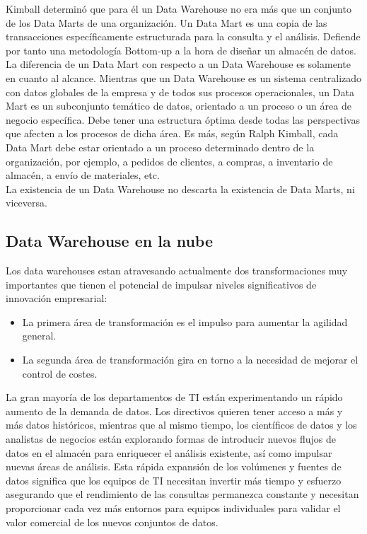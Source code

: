 \documentclass[%
 reprint,
 amsmath,amssymb,
 aps,
]{revtex4-1}
\begin{document}
\begin{itemize}
Kimball determinó que para él un Data Warehouse no era más que un conjunto de los Data Marts de una organización. Un Data Mart es una copia de las transacciones específicamente estructurada para la consulta y el análisis. Defiende por tanto una metodología Bottom-up a la hora de diseñar un almacén de datos.\\

La diferencia de un Data Mart con respecto a un Data Warehouse es solamente en cuanto al alcance. Mientras que un Data Warehouse es un sistema centralizado con datos globales de la empresa y de todos sus procesos operacionales, un Data Mart es un subconjunto temático de datos, orientado a un proceso o un área de negocio específica. Debe tener una estructura óptima desde todas las perspectivas que afecten a los procesos de dicha área. Es más, según Ralph Kimball, cada Data Mart debe estar orientado a un proceso determinado dentro de la organización, por ejemplo, a pedidos de clientes, a compras, a inventario de almacén, a envío de materiales, etc.\\

 La existencia de un Data Warehouse no descarta la existencia de Data Marts, ni viceversa. 

\end{itemize}





\subsection{Data Warehouse en la nube}

Los data warehouses estan atravesando actualmente dos transformaciones muy importantes que tienen el potencial de impulsar niveles significativos de innovación empresarial:


\begin{itemize}
	\item La primera área de transformación es el impulso para aumentar la agilidad general.
	\item La segunda área de transformación gira en torno a la necesidad de mejorar el control de costes.
\end{itemize}

La gran mayoría de los departamentos de TI están experimentando un rápido aumento de la demanda de datos. Los directivos quieren tener acceso a más y más datos históricos, mientras que al mismo tiempo, los científicos de datos y los analistas de negocios están explorando formas de introducir nuevos flujos de datos en el almacén para enriquecer el análisis existente, así como impulsar nuevas áreas de análisis. Esta rápida expansión de los volúmenes y fuentes de datos significa que los equipos de TI necesitan invertir más tiempo y esfuerzo asegurando que el rendimiento de las consultas permanezca constante y necesitan proporcionar cada vez más entornos para equipos individuales para validar el valor comercial de los nuevos conjuntos de datos.\\
\end{document}

